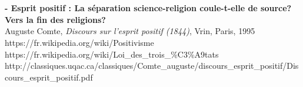 \documentclass{article}
\begin{document}
\begin{thebibliography}{9}
		\\\\
		\textbf{- Esprit positif : La séparation science-religion coule-t-elle de source? Vers la fin des religions?}\\
		Auguste Comte, \emph{Discours sur l'esprit positif (1844)}, Vrin, Paris, 1995\\
		https://fr.wikipedia.org/wiki/Positivisme\\
		https://fr.wikipedia.org/wiki/Loi\_des\_trois\_\%C3\%A9tats\\
		http://classiques.uqac.ca/classiques/Comte\_auguste/discours\_esprit\_positif/Discours\_esprit\_positif.pdf

\end{thebibliography}
\end{document}
